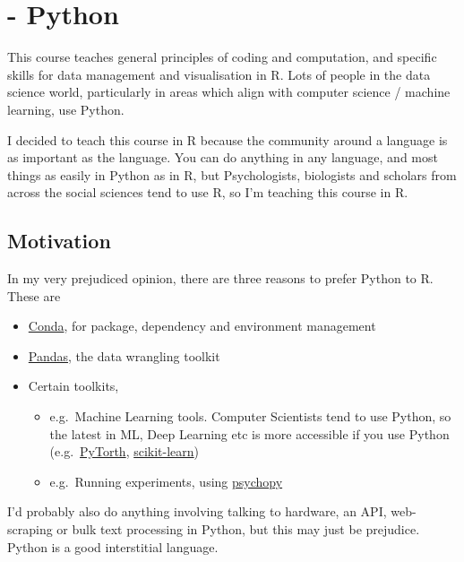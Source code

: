 \documentclass[
]{book}
\providecommand{\tightlist}{%
  \setlength{\itemsep}{0pt}\setlength{\parskip}{0pt}}
\begin{document}
\hypertarget{python}{%
\chapter*{- Python}\label{python}}


This course teaches general principles of coding and computation, and specific skills for data management and visualisation in R. Lots of people in the data science world, particularly in areas which align with computer science / machine learning, use Python.

I decided to teach this course in R because the community around a language is as important as the language. You can do anything in any language, and most things as easily in Python as in R, but Psychologists, biologists and scholars from across the social sciences tend to use R, so I'm teaching this course in R.

\hypertarget{motivation-2}{%
\section{Motivation}\label{motivation-2}}

In my very prejudiced opinion, there are three reasons to prefer Python to R. These are

\begin{itemize}
\tightlist
\item
  \href{https://docs.conda.io/en/latest/}{Conda}, for package, dependency and environment management
\item
  \href{https://pandas.pydata.org/}{Pandas}, the data wrangling toolkit
\item
  Certain toolkits,

  \begin{itemize}
  \tightlist
  \item
    e.g.~Machine Learning tools. Computer Scientists tend to use Python, so the latest in ML, Deep Learning etc is more accessible if you use Python (e.g.~\href{https://pytorch.org/}{PyTorth}, \href{https://scikit-learn.org/stable/}{scikit-learn})
  \item
    e.g.~Running experiments, using \href{https://www.psychopy.org/}{psychopy}
  \end{itemize}
\end{itemize}

I'd probably also do anything involving talking to hardware, an API, web-scraping or bulk text processing in Python, but this may just be prejudice. Python is a good interstitial language.
\end{document}

